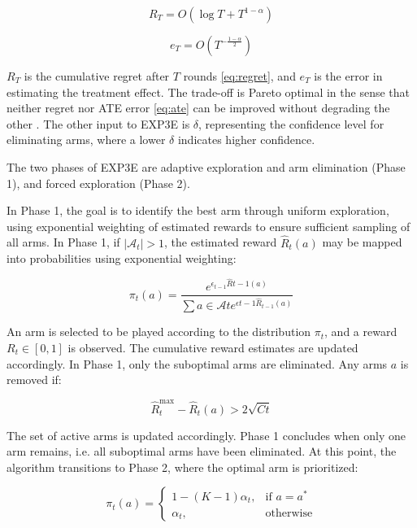 \begin{equation}\label{eq:exp3e_regret}
R_T = O(\log T + T^{1-\alpha})
\end{equation}

\begin{equation}\label{eq:exp3e_error}
e_T = O(T^{-\frac{1-\alpha}{2}})
\end{equation}

\(R_T\) is the cumulative regret after \(T\) rounds  \ref{eq:regret}, and \(e_T\) is the error in estimating the treatment effect. The trade-off is Pareto optimal in the sense that neither regret nor ATE error \ref{eq:ate} can be improved without degrading the other \citep{simchilevi2023adaptive}. The other input to EXP3E is $\delta$, representing the confidence level for eliminating arms, where a lower $\delta$ indicates higher confidence.

The two phases of EXP3E are adaptive exploration and arm elimination (Phase 1), and forced exploration (Phase 2).

In Phase 1, the goal is to identify the best arm through uniform exploration, using exponential weighting of estimated rewards to ensure sufficient sampling of all arms. In Phase 1, if \(|\mathcal{A}_t| > 1\), the estimated reward $\hat{R}_t(a)$ may be mapped into probabilities using exponential weighting:

\begin{equation}\label{eq:exp3e_phase1_weights}
\pi_t(a) = \frac{e^{\epsilon_{t-1} \hat{R}{t-1}(a)}}{\sum{a \in \mathcal{A}t} e^{\epsilon{t-1} \hat{R}_{t-1}(a)}}
\end{equation}

An arm is selected to be played according to the distribution \( \pi_t \), and a reward \( R_t \in [0,1] \) is observed. The cumulative reward estimates are updated accordingly. In Phase 1, only the suboptimal arms are eliminated. Any arms $a$ is removed if:

\begin{equation}\label{eq:exp3e_elimination}
\hat{R}_t^{\max} - \hat{R}_t(a) > 2 \sqrt{Ct}
\end{equation}

The set of active arms is updated accordingly. Phase 1 concludes when only one arm remains, i.e. all suboptimal arms have been eliminated. At this point, the algorithm transitions to Phase 2, where the optimal arm is prioritized:

\begin{equation}\label{eq:exp3e_phase2_policy}
\pi_t(a) =
\begin{cases}
1-(K-1)\alpha_t, & \text{if } a = a^* \\
\alpha_t, & \text{otherwise}
\end{cases}
\end{equation}

